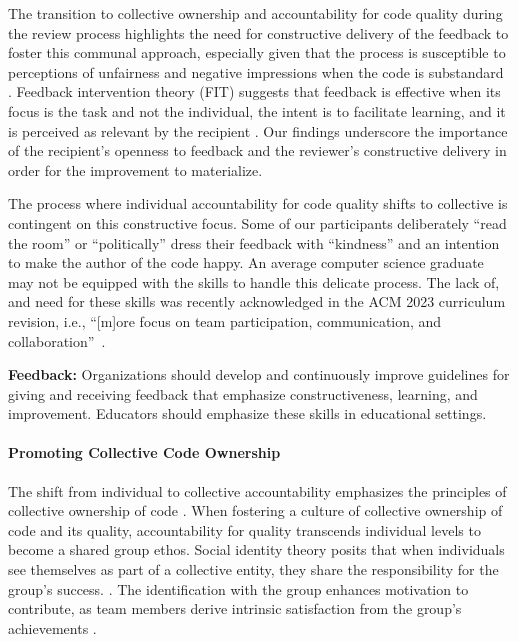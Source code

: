 The transition to collective ownership and accountability for code quality during the review process highlights the need for constructive delivery of the feedback to foster this communal approach, especially given that the process is susceptible to perceptions of unfairness \citep{german2018my} and negative impressions when the code is substandard \citep{bosu2013impact,bosu2016process}. Feedback intervention theory (FIT) suggests that feedback is effective when its focus is the task and not the individual, the intent is to facilitate learning, and it is perceived as relevant by the recipient \citep{kluger1996effects}. Our findings underscore the importance of the recipient's openness to feedback and the reviewer's constructive delivery in order for the improvement to materialize.

The process where individual accountability for code quality shifts to collective is contingent on this constructive focus. Some of our participants deliberately ``read the room'' or ``politically'' dress their feedback with ``kindness'' and an intention to make the author of the code happy. An average computer science graduate may not be  equipped with the skills to handle this delicate process. The lack of, and need for these skills was recently acknowledged in the ACM 2023 curriculum revision, i.e.,  ``[m]ore focus on team participation, communication, and collaboration''~\citep{ACMed23}.


\begin{tcolorbox}

\textbf{Feedback:} Organizations should develop and continuously improve guidelines for giving and receiving feedback that emphasize constructiveness, learning, and improvement. Educators should emphasize these skills in educational settings.

\end{tcolorbox}

\paragraph*{Promoting Collective Code Ownership}

The shift from individual to collective accountability emphasizes the principles of collective ownership of code \citep{greiler2015code,bird2011don}. When fostering a culture of collective ownership of code and its quality, accountability for quality transcends individual levels to become a shared group ethos. Social identity theory posits that when individuals see themselves as part of a collective entity, they share the responsibility for the group's success. \citep{tajfel1979integrative}. The identification with the group enhances motivation to contribute, as team members derive intrinsic satisfaction from the group's achievements \citep{tajfel1979integrative}.

